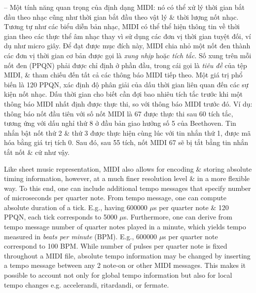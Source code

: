 \documentclass{article}
\begin{document}
\begin{itemize}
\begin{itemize}
\begin{itemize}
			-- Một tính năng quan trọng của định dạng MIDI: nó có thể xử lý thời gian bắt đầu theo nhạc cũng như thời gian bắt đầu theo vật lý \& thời lượng nốt nhạc. Tương tự như các biểu diễn bản nhạc, MIDI có thể thể hiện thông tin về thời gian theo các thực thể âm nhạc thay vì sử dụng các đơn vị thời gian tuyệt đối, ví dụ như micro giây. Để đạt được mục đích này, MIDI chia nhỏ một nốt đen thành các đơn vị thời gian cơ bản được gọi là {\it xung nhịp} hoặc {\it tích tắc}. Số xung trên mỗi nốt đen (PPQN) phải được chỉ định ở phần đầu, trong cái gọi là {\it tiêu đề} của tệp MIDI, \& tham chiếu đến tất cả các thông báo MIDI tiếp theo. Một giá trị phổ biến là 120 PPQN, xác định độ phân giải của dấu thời gian liên quan đến các sự kiện nốt nhạc. Dấu thời gian cho biết cần đợi bao nhiêu tích tắc trước khi một thông báo MIDI nhất định được thực thi, so với thông báo MIDI trước đó. Ví dụ: thông báo nốt đầu tiên với số nốt MIDI là 67 được thực thi sau 60 tích tắc, tương ứng với dấu nghỉ thứ 8 ở đầu bản giao hưởng số 5 của Beethoven. Tin nhắn bật nốt thứ 2 \& thứ 3 được thực hiện cùng lúc với tin nhắn thứ 1, được mã hóa bằng giá trị tích 0. Sau đó, sau 55 tích, nốt MIDI 67 sẽ bị tắt bằng tin nhắn tắt nốt \& cứ như vậy.
			
			Like sheet music representation, MIDI also allows for encoding \& storing absolute timing information, however, at a much finer resolution level \& in a more flexible way. To this end, one can include additional tempo messages that specify number of microseconds per quarter note. From tempo message, one can compute absolute duration of a tick. E.g., having 600000 $\mu$s per quarter note \& 120 PPQN, each tick corresponds to 5000 $\mu$s. Furthermore, one can derive from tempo message number of quarter notes played in a minute, which yields tempo measured in {\it beats per minute} (BPM). E.g., 600000 $\mu$s per quarter note correspond to 100 BPM. While number of pulses per quarter note is fixed throughout a MIDI file, absolute tempo information may be changed by inserting a tempo message between any 2 note-on or other MIDI messages. This makes it possible to account not only for global tempo information but also for local tempo changes e.g. accelerandi, ritardandi, or fermate.
			

\end{itemize}
\end{itemize}
\end{itemize}
\end{document}
